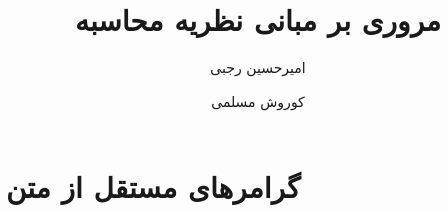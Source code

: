 \documentclass{article}
\title{مروری بر مبانی نظریه محاسبه}
\author{
	امیرحسین رجبی
	\and
	کوروش مسلمی
}
\date{}
\begin{document}
	\maketitle
	
	\doublespacing
	
	\section{
	گرامرهای مستقل از متن
	}
	
	
	
 
\end{document}
